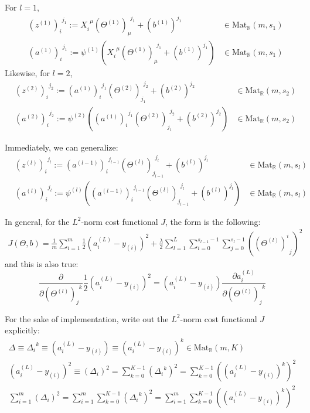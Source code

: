 \documentclass[10pt]{amsart}
\begin{document}
\begin{multicols*}{2}
For $l=1$, 
\[
\begin{aligned}
& (z^{(1)})_i^{\  \  j_1} := X_i^{\  \  \mu} (\Theta^{(1)})_{\mu}^{\  \  j_1} + (b^{(1)})^{j_1}  & \in \text{Mat}_{\mathbb{R}}(m,s_1) \\
& (a^{(1)})_i^{\  \  j_1} := \psi^{(1)}( X_i^{\  \  \mu} (\Theta^{(1)})_{\mu}^{\  \  j_1} + (b^{(1)})^{j_1} ) & \in \text{Mat}_{\mathbb{R}}(m,s_1)
\end{aligned}
\]  
Likewise, for $l=2$, 
\[
\begin{aligned}
& (z^{(2)})_i^{\  \  j_2} := (a^{(1)})_i^{\  \  j_1} (\Theta^{(2)})_{j_1}^{\  \  j_2} + (b^{(2)})^{j_2}  & \in \text{Mat}_{\mathbb{R}}(m,s_2) \\
& (a^{(2)})_i^{\  \  j_2} := \psi^{(2)}( (a^{(1)})_i^{\  \  j_1} (\Theta^{(2)})_{j_1}^{\  \  j_2} + (b^{(2)})^{j_2} ) & \in \text{Mat}_{\mathbb{R}}(m,s_2)
\end{aligned}
\]  

Immediately, we can generalize:
\begin{equation}
\begin{aligned}
& (z^{(l)})_i^{\  \  j_l} := (a^{(l-1)})_i^{\  \  j_{l-1}} (\Theta^{(l)})_{j_{l-1}}^{\  \  j_l} + (b^{(l)})^{j_l}  & \in \text{Mat}_{\mathbb{R}}(m,s_l) \\
& (a^{(l)})_i^{\  \  j_l} := \psi^{(l)}( (a^{(l-1)})_i^{\  \  j_{l-1}} (\Theta^{(l)})_{j_{l-1}}^{\  \  j_l} + (b^{(l)})^{j_l} ) & \in \text{Mat}_{\mathbb{R}}(m,s_l)
\end{aligned}
\end{equation}

In general, for the $L^2$-norm cost functional $J$, the form is the following: 
\begin{equation}
\begin{aligned}
J(\Theta,b)  =  \frac{ 1}{m} \sum_{i=1}^m \frac{1}{2} ( a^{(L)}_i - y_{(i)})^2 + \frac{\lambda}{2} \sum_{l=1}^L \sum_{i=0}^{s_{l-1}-1} \sum_{j=0}^{ s_l-1} ((\Theta^{(l)})^i_{\  \  j})^2
\end{aligned}
\end{equation}
and this is also true:
\begin{equation}
\frac{ \partial }{ \partial (\Theta^{(l)})_j^{\  \  k} } \frac{1}{2} (a_i^{(L)} - y_{(i)})^2 = (a_i^{(L)} - y_{(i)}) \frac{\partial a_i^{(L)} }{ \partial (\Theta^{(l)})_j^{\  \  k} }
\end{equation}

For the sake of implementation, write out the $L^2$-norm cost functional $J$ explicitly:  
\[
\begin{gathered}
	\Delta \equiv \Delta_i^{\  \  k} \equiv (a_i^{(L)} - y_{(i)}) \equiv (a_i^{(L)} - y_{(i)})^k \in \text{Mat}_{\mathbb{R}}(m,K) \\ 
	 (a_i^{(L)} - y_{(i)})^2 \equiv (\Delta_i)^2 = \sum_{k=0}^{K-1}( \Delta_i^{\  \  k})^2 = \sum_{k=0}^{K-1} ((a_i^{(L)} - y_{(i)})^k)^2   \\
\sum_{i=1}^m (\Delta_i)^2 = \sum_{i=1}^m \sum_{k=0}^{K-1} (\Delta_i^{\  \  k})^2 = \sum_{i=1}^m \sum_{k=0}^{K-1} ((a_i^{(L)} - y_{(i)})^k)^2
\end{gathered}
\]


\end{multicols*}
\end{document}
